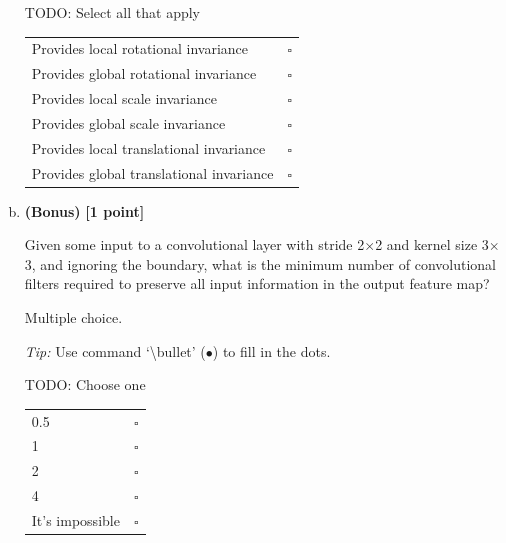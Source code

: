 \begin{enumerate}[(a)]
\begin{tcolorbox}[colback=white!5!white,colframe=green!75!black]
TODO: Select all that apply %

\begin{tabular}[h]{lr}
\toprule
Provides local rotational invariance & $\square$ \\
Provides global rotational invariance & $\square$ \\
Provides local scale invariance & $\square$ \\
Provides global scale invariance & $\square$ \\
Provides local translational invariance & $\square$ \\
Provides global translational invariance & $\square$ \\
\bottomrule
\end{tabular}
\end{tcolorbox}


\item
\textbf{(Bonus)} \textbf{[1 point]}
\begin{tcolorbox}[colback=blue!5!white,colframe=blue!75!black]
Given some input to a convolutional layer with stride 2$\times$2 and kernel size 3$\times$3, and ignoring the boundary, what is the minimum number of convolutional filters required to preserve all input information in the output feature map?
\end{tcolorbox}

Multiple choice.

\emph{Tip:} Use command  `\textbackslash bullet' ($\bullet$) to fill in the dots.

\begin{tcolorbox}[colback=white!5!white,colframe=green!75!black]
TODO: Choose one %

\begin{tabular}[h]{lc}
\toprule
0.5 & $\square$ \\
1 & $\square$ \\
2 & $\square$ \\
4 & $\square$ \\
It's impossible & $\square$ \\
\bottomrule
\end{tabular}
\end{tcolorbox}
\end{enumerate}


\pagebreak
